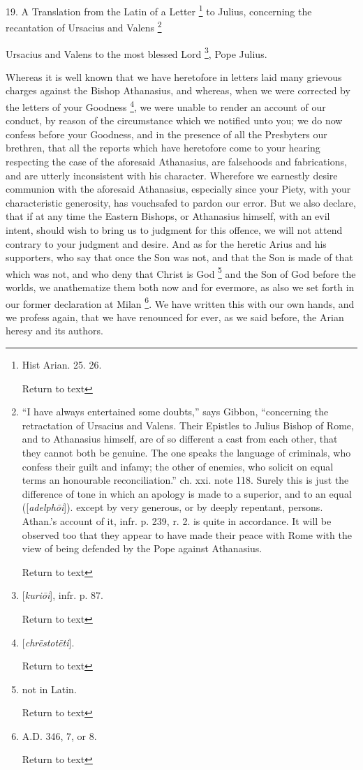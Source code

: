 19. A Translation from the Latin of a Letter \footnote{Hist Arian. 25. 26.

Return to text} to Julius, concerning the recantation of Ursacius and Valens \footnote{``I have always entertained some doubts,'' says Gibbon, ``concerning the
retractation of Ursacius and Valens. Their Epistles to Julius Bishop
of Rome, and to Athanasius himself, are of so different a cast from
each other, that they cannot both be genuine. The one speaks the
language of criminals, who confess their guilt and infamy; the other
of enemies, who solicit on equal terms an honourable reconciliation.''
ch. xxi. note 118. Surely this is just the difference of tone in which
an apology is made to a superior, and to an equal ([\emph{adelph\={o}i}]).
except by very generous, or by deeply repentant, persons. Athan.'s
account of it, infr. p. 239, r. 2. is quite in accordance. It will be
observed too that they appear to have made their peace with Rome with
the view of being defended by the Pope against Athanasius.

Return to text

}

Ursacius and Valens to the most blessed Lord \footnote{[\emph{kuri\={o}i}], infr. p. 87.

Return to text}, Pope Julius.

Whereas it is well known that we have heretofore
in letters laid many grievous charges against the Bishop Athanasius,
and whereas, when we were corrected by the letters of your Goodness \footnote{[\emph{chr\={e}stot\={e}ti}].

Return to text}, we were unable to render an account of our conduct, by reason
of the circumstance which we notified unto you; we do now confess
before your Goodness, and in the presence of all the Presbyters our
brethren, that all the reports which have heretofore come to your
hearing respecting the case of the aforesaid Athanasius, are
falsehoods and fabrications, and are utterly inconsistent with his
character. Wherefore we earnestly desire communion with the aforesaid
Athanasius, especially since your Piety, with your characteristic
generosity, has vouchsafed to pardon our error. But we also
declare, that if at any time the Eastern Bishops, or Athanasius
himself, with an evil intent, should wish to bring us to judgment for
this offence, we will not attend contrary to your judgment and desire.
And as for the heretic Arius and his supporters, who say that once the
Son was not, and that the Son is made of that which was not, and who
deny that Christ is God \footnote{not in Latin.

Return to text}
and the Son of God before the worlds, we anathematize them both now
and for evermore, as also we set forth in our former declaration at
Milan \footnote{A.D.
346, 7, or 8.

Return to text}. We have
written this with our own hands, and we profess again, that we have
renounced for ever, as we said before, the Arian heresy and its
authors.

